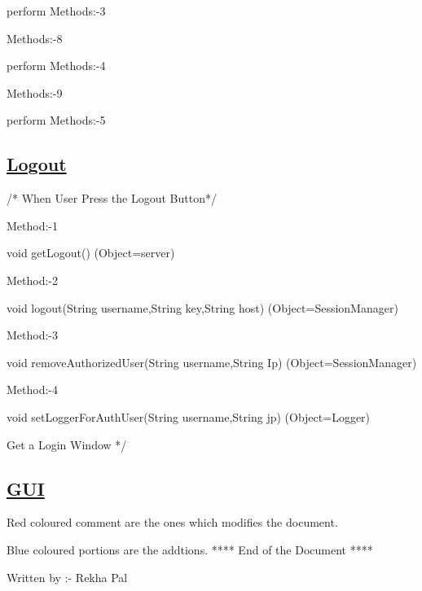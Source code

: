 \documentclass{article}
\begin{document}
perform  Methods:-3 

Methods:-8    

perform   Methods:-4 

Methods:-9 

 perform   Methods:-5 

\subsection*{\underline{Logout}}

    /* When User Press the Logout Button*/ 

Method:-1 

void getLogout()                            (Object=server) 

Method:-2 

void logout(String username,String key,String host)    (Object=SessionManager) 

Method:-3 

void removeAuthorizedUser(String username,String Ip)   (Object=SessionManager) 

Method:-4 

void setLoggerForAuthUser(String username,String jp)   (Object=Logger) 
 
Get a Login Window */ 
\begin{center}

\label{figure:brihSync_Logout.latex}
\end{center}
\subsection*{\underline{GUI}}

Red coloured comment are the ones which modifies the document. 

Blue coloured portions are the addtions.
 **** End of the Document ****
\begin{center}

\label{figure:brihSync_GUI.latex}
\end{center}

Written by :- Rekha Pal
\end{document}
